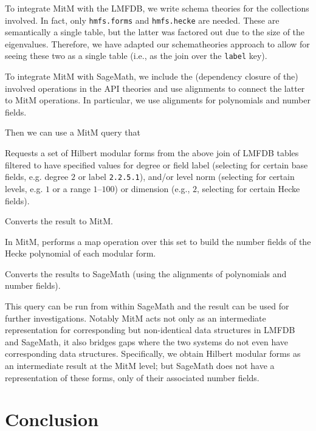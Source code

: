 \documentclass{llncs}
\begin{document}
To integrate MitM with the LMFDB, we write schema theories for the collections involved.
In fact, only \texttt{hmfs.forms} and \texttt{hmfs.hecke} are needed.
These are semantically a single table, but the latter was factored out due to the size of the eigenvalues.
Therefore, we have adapted our schematheories approach to allow for seeing these two as a single table (i.e., as the join over the \texttt{label} key).

To integrate MitM with SageMath, we include the (dependency closure of the) involved operations in the API theories and use alignments to connect the latter to MitM operations.
In particular, we use alignments for polynomials and number fields.

Then we can use a MitM query that
\begin{compactenum}
 \item Requests a set of Hilbert modular forms from the above join of
   LMFDB tables filtered to have specified values for degree or field
   label (selecting for certain base fields, e.g. degree $2$ or label
   {\tt 2.2.5.1}), and/or level norm
   (selecting for certain levels, e.g. $1$ or a range $1$--$100$) or
   dimension (e.g., $2$, selecting for certain Hecke fields).
 \item Converts the result to MitM.
 \item In MitM, performs a map operation over this set to build the number fields of the Hecke polynomial of each modular form.
 \item Converts the results to SageMath (using the alignments of polynomials and number fields).
\end{compactenum}

This query can be run from within SageMath and the result can be used for further investigations.
Notably MitM acts not only as an intermediate representation for corresponding but non-identical data structures in LMFDB and SageMath, it also bridges gaps where the two systems do not even have corresponding data structures.
Specifically, we obtain Hilbert modular forms as an intermediate result at the MitM level; but SageMath does not have a representation of these forms, only of their associated number fields.


\section{Conclusion}




\end{document}

